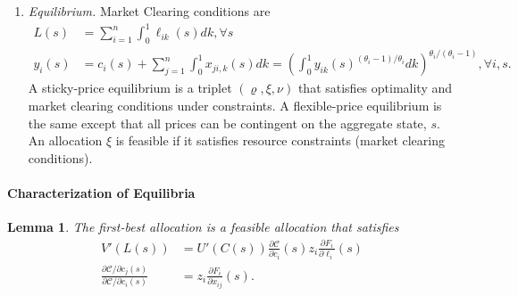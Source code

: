 \documentclass[12pt]{article}
\newtheorem{lemma}{Lemma}
\numberwithin{equation}{section}
\begin{document}
\begin{enumerate}
    The monetary policy is implemented by an arbitrary function $m(s)$ so that it can be state contingent. In other words, the monetyary authority has the ability to commit, ex ante, to a policy that can in principle depend on the realized productivities and the profile of beliefs throughout the economy.

    Policy:
    \[ \nu = \left\{\left(\tau_1, \cdots, \tau_n\right), m(s) \right\}_{s\in S}.\]

    \item \textit{Equilibrium.} Market Clearing conditions are 
    \begin{align*}
        L(s) &= \sum_{i=1}^n \int_0^1 \ell_{ik}(s)dk, \forall s\\
        y_i(s) & = c_i(s) + \sum_{j=1}^n \int^1_0 x_{ji,k}(s) dk = \left(\int^1_0 y_{ik}(s)^{(\theta_i-1)/{\theta_i}} dk\right)^{{\theta_i}/(\theta_i - 1)}, \forall i, s.
    \end{align*}
    A sticky-price equilibrium is a triplet $(\varrho, \xi, \nu)$ that satisfies optimality and market clearing conditions under constraints. A flexible-price equilibrium is the same except that all prices can be contingent on the aggregate state, $s$. An allocation $\xi$ is feasible if it satisfies resource constraints (market clearing conditions).
\end{enumerate}

\paragraph{Characterization of Equilibria}
\begin{lemma}
    The first-best allocation is a feasible allocation that satisfies
    \begin{align}
        V'(L(s)) &= U'(C(s))\frac{\partial \mathcal{C}}{\partial c_i}(s) z_i\frac{\partial F_i}{\partial \ell_i}(s) \label{eq:first_best_goods_labour} \\
        \frac{\partial \mathcal{C} / \partial c_j(s)}{\partial \mathcal{C} / \partial c_i(s)} &= z_i\frac{\partial F_i}{\partial x_{ij}}(s). 
        \label{eq:first_best_input}
    \end{align}
\end{lemma}
\end{document}
